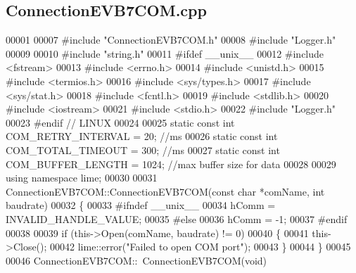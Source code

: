 \subsection{Connection\+E\+V\+B7\+C\+O\+M.\+cpp}
\label{ConnectionEVB7COM_8cpp_source}

\begin{DoxyCode}
00001 
00007 \textcolor{preprocessor}{#include "ConnectionEVB7COM.h"}
00008 \textcolor{preprocessor}{#include "Logger.h"}
00009 
00010 \textcolor{preprocessor}{#include "string.h"}
00011 \textcolor{preprocessor}{#ifdef \_\_unix\_\_}
00012 \textcolor{preprocessor}{#include <fstream>}
00013 \textcolor{preprocessor}{#include <errno.h>}
00014 \textcolor{preprocessor}{#include <unistd.h>}
00015 \textcolor{preprocessor}{#include <termios.h>}
00016 \textcolor{preprocessor}{#include <sys/types.h>}
00017 \textcolor{preprocessor}{#include <sys/stat.h>}
00018 \textcolor{preprocessor}{#include <fcntl.h>}
00019 \textcolor{preprocessor}{#include <stdlib.h>}
00020 \textcolor{preprocessor}{#include <iostream>}
00021 \textcolor{preprocessor}{#include <stdio.h>}
00022 \textcolor{preprocessor}{#include "Logger.h"}
00023 \textcolor{preprocessor}{#endif // LINUX}
00024 
00025 \textcolor{keyword}{static} \textcolor{keyword}{const} \textcolor{keywordtype}{int} COM_RETRY_INTERVAL = 20; \textcolor{comment}{//ms}
00026 \textcolor{keyword}{static} \textcolor{keyword}{const} \textcolor{keywordtype}{int} COM_TOTAL_TIMEOUT = 300; \textcolor{comment}{//ms}
00027 \textcolor{keyword}{static} \textcolor{keyword}{const} \textcolor{keywordtype}{int} COM_BUFFER_LENGTH = 1024; \textcolor{comment}{//max buffer size for data}
00028 
00029 \textcolor{keyword}{using namespace }lime;
00030 
00031 ConnectionEVB7COM::ConnectionEVB7COM(\textcolor{keyword}{const} \textcolor{keywordtype}{char} *comName, \textcolor{keywordtype}{int} baudrate)
00032 \{
00033 \textcolor{preprocessor}{#ifndef \_\_unix\_\_}
00034     hComm = INVALID\_HANDLE\_VALUE;
00035 \textcolor{preprocessor}{#else}
00036     hComm = -1;
00037 \textcolor{preprocessor}{#endif}
00038 
00039     \textcolor{keywordflow}{if} (this->Open(comName, baudrate) != 0)
00040     \{
00041         this->Close();
00042         lime::error(\textcolor{stringliteral}{"Failed to open COM port"});
00043     \}
00044 \}
00045 
00046 ConnectionEVB7COM::~ConnectionEVB7COM(\textcolor{keywordtype}{void})

\end{DoxyCode}
